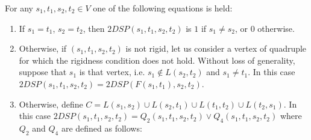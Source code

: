 \begin{theorem} \label{main_theorem}
For any $s_1, t_1, s_2, t_2 \in V$ one of the following equations is held:
\begin{enumerate} 
\item If $s_1 = t_1$, $s_2 = t_2$, then $2DSP(s_1, t_1, s_2, t_2)$ is $1$ if $s_1 \neq s_2$, or $0$ otherwise.
\item Otherwise, if $(s_1, t_1, s_2, t_2)$ is not rigid, let us consider a vertex of quadruple for which the rigidness condition does not hold. Without loss of generality, suppose that $s_1$ is that vertex, i.e. $s_1 \notin L(s_2, t_2)$ and $s_1 \neq t_1$. In this case $2DSP(s_1, t_1, s_2, t_2) = 2DSP(F(s_1, t_1), s_2, t_2)$.
\item Otherwise, define $C = L(s_1, s_2) \cup L(s_2, t_1) \cup L(t_1, t_2) \cup L(t_2, s_1)$. In this case $2DSP(s_1, t_1, s_2, t_2) = Q_2(s_1, t_1, s_2, t_2) \vee Q_4(s_1, t_1, s_2, t_2)$ where $Q_2$ and $Q_4$ are defined as follows:


\end{enumerate}
\end{theorem}

